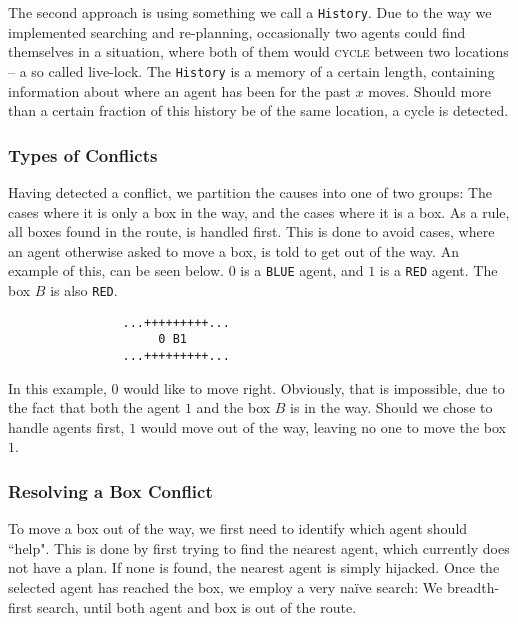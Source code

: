 \documentclass[letterpaper]{article}
\begin{document}

			The second approach is using something we call a \verb=History=. Due to the way we implemented searching and re-planning, occasionally two agents could find themselves in a situation, where both of them would \textsc{cycle} between two locations -- a so called live-lock. The \verb=History= is a memory of a certain length, containing information about where an agent has been for the past $x$ moves. Should more than a certain fraction of this history be of the same location, a cycle is detected.

		\subsubsection{Types of Conflicts}
			Having detected a conflict, we partition the causes into one of two groups: The cases where it is only a box in the way, and the cases where it is a box. As a rule, all boxes found in the route, is handled first. This is done to avoid cases, where an agent otherwise asked to move a box, is told to get out of the way. An example of this, can be seen below. $0$ is a \verb=BLUE= agent, and $1$ is a \verb=RED= agent. The box $B$ is also \verb=RED=. 
			\begin{verbatim}
				...+++++++++...
				     0 B1
				...+++++++++...
			\end{verbatim}
			In this example, $0$ would like to move right. Obviously, that is impossible, due to the fact that both the agent $1$ and the box $B$ is in the way. Should we chose to handle agents first, $1$ would move out of the way, leaving no one to move the box $1$.

		\subsubsection{Resolving a Box Conflict}
			To move a box out of the way, we first need to identify which agent should ``help". This is done by first trying to find the nearest agent, which currently does not have a plan. If none is found, the nearest agent is simply hijacked. Once the selected agent has reached the box, we employ a very naïve search: We breadth-first search, until both agent and box is out of the route.
\end{document}
